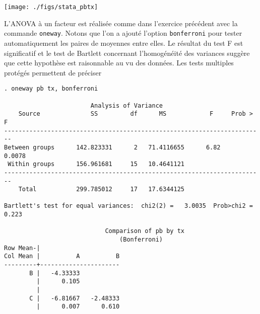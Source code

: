 \texttt{[image: ./figs/stata\_pbtx]}

L'ANOVA à un facteur est réalisée comme dans l'exercice précédent avec la
commande \texttt{oneway}. Notons que l'on a ajouté l'option
\texttt{bonferroni} pour tester automatiquement les paires de moyennes entre
elles. Le résultat du test F est significatif et le test de Bartlett
concernant l'homogénéité des variances suggère que cette hypothèse est
raisonnable au vu des données. Les tests multiples protégés permettent de
préciser 
\begin{verbatim}
. oneway pb tx, bonferroni

                        Analysis of Variance
    Source              SS         df      MS            F     Prob > F
------------------------------------------------------------------------
Between groups      142.823331      2   71.4116655      6.82     0.0078
 Within groups      156.961681     15   10.4641121
------------------------------------------------------------------------
    Total           299.785012     17   17.6344125

Bartlett's test for equal variances:  chi2(2) =   3.0035  Prob>chi2 = 0.223

                            Comparison of pb by tx
                                (Bonferroni)
Row Mean-|
Col Mean |          A          B
---------+----------------------
       B |   -4.33333
         |      0.105
         |
       C |   -6.81667   -2.48333
         |      0.007      0.610
\end{verbatim}

